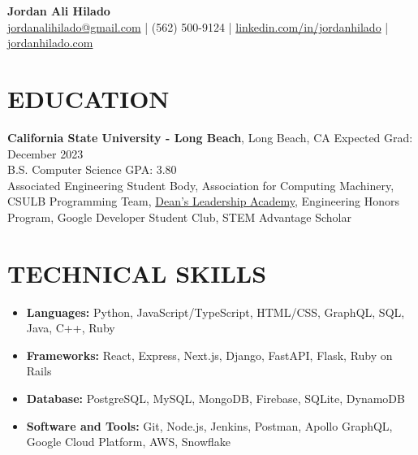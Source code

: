 \documentclass[a4paper,10pt]{extarticle}
\begin{document}
\pagestyle{empty}

\begin{center}
\textbf{\Large Jordan Ali Hilado}\\[2pt] %
\href{mailto:jordanalihilado@gmail.com}{jordanalihilado@gmail.com} | (562) 500-9124 | \href{https://www.linkedin.com/in/jordanhilado}{linkedin.com/in/jordanhilado} | \href{https://jordanhilado.com/}{jordanhilado.com} %
\end{center}

\section*{EDUCATION}
\noindent
\textbf{California State University - Long Beach}, Long Beach, CA \hfill Expected Grad: December 2023\\ %
B.S. Computer Science \hfill GPA: 3.80\\ %
Associated Engineering Student Body, Association for Computing Machinery, CSULB Programming Team, \href{https://www.csulb.edu/college-of-engineering/aerospace-corporation-leadership-academy}{Dean’s Leadership Academy}, Engineering Honors Program, Google Developer Student Club, STEM Advantage Scholar %

\section*{TECHNICAL SKILLS}
\begin{itemize}
    \item \textbf{Languages:} Python, JavaScript/TypeScript, HTML/CSS, GraphQL, SQL, Java, C++, Ruby %
    \item \textbf{Frameworks:} React, Express, Next.js, Django, FastAPI, Flask, Ruby on Rails %
    \item \textbf{Database:} PostgreSQL, MySQL, MongoDB, Firebase, SQLite, DynamoDB %
    \item \textbf{Software and Tools:} Git, Node.js, Jenkins, Postman, Apollo GraphQL, Google Cloud Platform, AWS, Snowflake %
\end{itemize}

\end{document}
